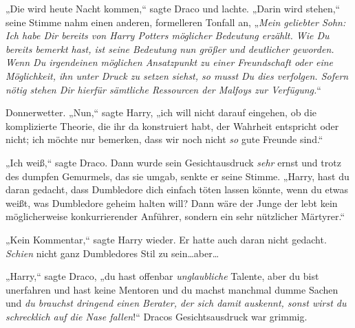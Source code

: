 „Die wird heute Nacht kommen,“ sagte Draco und lachte. „Darin wird stehen,“ seine Stimme nahm einen anderen, formelleren Tonfall an, „\emph{Mein geliebter Sohn: Ich habe Dir bereits von Harry Potters möglicher Bedeutung erzählt. Wie Du bereits bemerkt hast, ist seine Bedeutung nun größer und deutlicher geworden. Wenn Du irgendeinen möglichen Ansatzpunkt zu einer Freundschaft oder eine Möglichkeit, ihn unter Druck zu setzen siehst, so musst Du dies verfolgen. Sofern nötig stehen Dir hierfür sämtliche Ressourcen der Malfoys zur Verfügung.}“

Donnerwetter. „Nun,“ sagte Harry, „ich will nicht darauf eingehen, ob die komplizierte Theorie, die ihr da konstruiert habt, der Wahrheit entspricht oder nicht; ich möchte nur bemerken, dass wir noch nicht \emph{so} gute Freunde sind.“

„Ich weiß,“ sagte Draco. Dann wurde sein Gesichtausdruck \emph{sehr} ernst und trotz des dumpfen Gemurmels, das sie umgab, senkte er seine Stimme. „Harry, hast du daran gedacht, dass Dumbledore dich einfach töten lassen könnte, wenn du etwas weißt, was Dumbledore geheim halten will? Dann wäre der Junge der lebt kein möglicherweise konkurrierender Anführer, sondern ein sehr nützlicher Märtyrer.“

„Kein Kommentar,“ sagte Harry wieder. Er hatte auch daran nicht gedacht. \emph{Schien} nicht ganz Dumbledores Stil zu sein…aber…

„Harry,“ sagte Draco, „du hast offenbar \emph{unglaubliche} Talente, aber du bist unerfahren und hast keine Mentoren und du machst manchmal dumme Sachen und \emph{du brauchst dringend einen Berater, der sich damit auskennt, sonst wirst du schrecklich auf die Nase fallen}!“ Dracos Gesichtsausdruck war grimmig.

